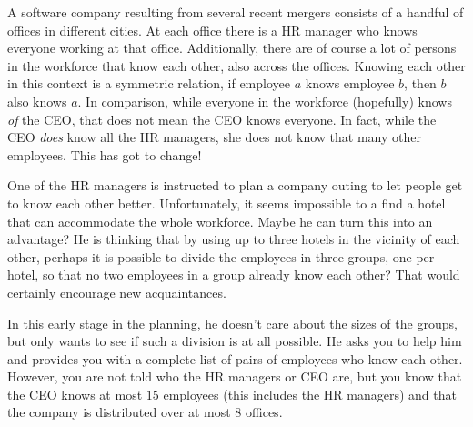 
%

A software company resulting from several recent mergers consists of a handful of offices in different cities. At each office there is a HR manager who knows everyone working at that office. Additionally, there are of course a lot of persons in the workforce that know each other, also across the offices.
Knowing each other in this context is a symmetric relation, if employee $a$ knows employee $b$, then $b$ also knows $a$. In comparison, while everyone in the workforce (hopefully) knows \emph{of} the CEO, that does not mean the CEO knows everyone. In fact, while the CEO \emph{does} know all the HR managers, she does not know that many other employees. This has got to change!

One of the HR managers is instructed to plan a company outing to let people get to know each other better. Unfortunately, it seems impossible to a find a hotel that can accommodate the whole workforce.
Maybe he can turn this into an advantage? He is thinking that by using up to three hotels in the vicinity of each other, perhaps it is possible to divide the employees in three groups, one per hotel, so that no two employees in a group already know each other? That would certainly encourage new acquaintances.

In this early stage in the planning, he doesn't care about the sizes of the groups, but only wants to see if such a division is at all possible. He asks you to help him and provides you with a complete list of pairs of employees who know each other. However, you are not told who the HR managers or CEO are, but you know that the CEO knows at most $15$ employees (this includes the HR managers) and that the company is distributed over at most $8$ offices.

